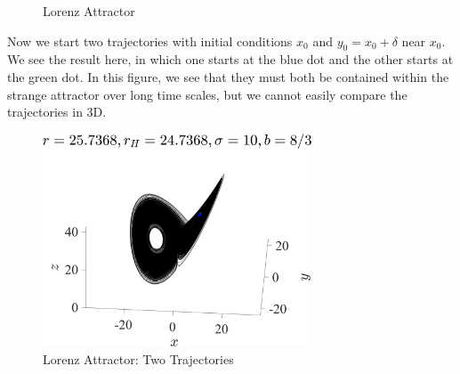 \documentclass[11pt]{article}
\begin{document}
\begin{figure}[h]
\centering
{}
\caption{Lorenz Attractor}
\end{figure}

\clearpage
Now we start two trajectories with initial conditions $x_0$ and $y_0 = x_0 + \delta$ near $x_0$. We see the result here, in which one starts at the blue dot and the other starts at the green dot. In this figure, we see that they must both be contained within the strange attractor over long time scales, but we cannot easily compare the trajectories in 3D.
\begin{figure}[h]
\centering
\includegraphics[width=8cm]{Lorenz_r25.73682_trajectories.png}
\caption{Lorenz Attractor: Two Trajectories}
\end{figure}
\end{document}

